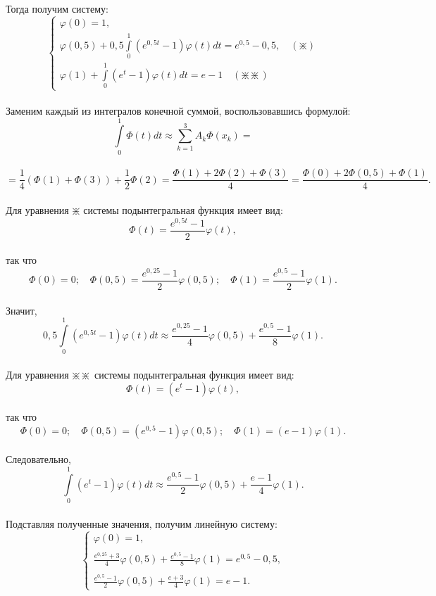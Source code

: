 \documentclass[12pt]{article}
\begin{document}
Тогда получим систему:\\
\begin{equation*}
\begin{cases}
\varphi(0) = 1, \\ 
\varphi(0,5) + 0,5 \int\limits_0^1 (e^{0,5t} - 1)\varphi(t) dt = e^{0,5} - 0,5 ,  \quad  (\divideontimes)\\
\varphi(1) + \int\limits_0^1 (e^t - 1)\varphi(t)dt = e - 1 \quad (\divideontimes\divideontimes)
\end{cases}
\end{equation*}\\
Заменим каждый из интегралов конечной суммой, воспользовавшись формулой:\\
$$ \int\limits_0^1 \Phi(t)dt \approx \sum\limits_{k=1}^3 A_k\Phi(x_k) = $$\\
$$= \frac{1}{4}\left( \Phi(1) + \Phi(3) \right) + \frac{1}{2}\Phi(2) = \frac{\Phi(1) + 2\Phi(2) + \Phi(3)}{4} = \frac{\Phi(0) + 2\Phi(0,5) + \Phi(1)}{4} . $$\\
Для уравнения $ \divideontimes $ системы подынтегральная функция имеет вид:\\
$$ \Phi(t) = \frac{e^{0,5t}-1}{2}\varphi(t) , $$\\
так что\\
$$\Phi(0) = 0; \quad \Phi(0,5) = \frac{e^{0,25}-1}{2}\varphi(0,5); \quad \Phi(1) = \frac{e^{0,5}-1}{2}\varphi(1). $$\\
Значит,\\
$$ 0,5\int\limits_0^1(e^{0,5t}-1)\varphi(t)dt \approx \frac{e^{0,25}-1}{4}\varphi(0,5) + \frac{e^{0,5}-1}{8}\varphi(1).  $$\\
Для уравнения $ \divideontimes\divideontimes $ системы подынтегральная функция имеет вид:\\
$$ \Phi(t) = (e^{t}-1)\varphi(t) , $$\\
так что\\
$$\Phi(0) = 0; \quad \Phi(0,5) = (e^{0,5}-1)\varphi(0,5); \quad \Phi(1) = (e-1)\varphi(1). $$\\
Следовательно,\\
$$ \int\limits_0^1(e^{t}-1)\varphi(t)dt \approx \frac{e^{0,5}-1}{2}\varphi(0,5) + \frac{e-1}{4}\varphi(1).  $$\\
Подставляя полученные значения, получим линейную систему:\\
\begin{equation*}
\begin{cases}
\varphi(0) = 1, \\ 
\\
\frac{e^{0,25}+3}{4}\varphi(0,5) + \frac{e^{0,5}-1}{8}\varphi(1) = e^{0,5} - 0,5 ,  \\
\\
\frac{e^{0,5}-1}{2}\varphi(0,5) + \frac{e+3}{4}\varphi(1) = e - 1 .
\end{cases}
\end{equation*}\\
\end{document}
